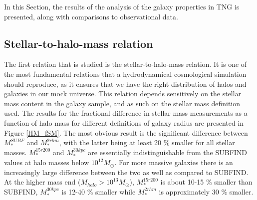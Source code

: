 In this Section, the results of the analysis of the galaxy properties in TNG is presented, along with comparisons to observational data.

\subsection{Stellar-to-halo-mass relation}

The first relation that is studied is the stellar-to-halo-mass relation. It is one of the most fundamental relations that a hydrodynamical cosmological simulation should reproduce, as it ensures that we have the right distribution of halos and galaxies in our mock universe. This relation depends sensitively on the stellar mass content in the galaxy sample, and as such on the stellar mass definition used. The results for the fractional difference in stellar mass measurements as a function of halo mass for different definitions of galaxy radius are presented in Figure \ref{HM_fSM}. The most obvious result is the significant difference between $M_\ast^{SUBF}$ and $M_\ast^{2rhm}$, with the latter being at least 20 \% smaller for all stellar masses. $M_\ast^{15r200}$ and $M_\ast^{30kpc}$ are essentially indistinguishable from the SUBFIND values at halo masses below $10^{12} M_{\odot}$. For more massive galaxies there is an increasingly large difference between the two as well as compared to SUBFIND. At the higher mass end ($M_{halo} > 10^{13} M_{\odot}$), $M_\ast^{15r200}$ is about 10-15 \% smaller than SUBFIND, $M_\ast^{30kpc}$ is 12-40 \% smaller while $M_\ast^{2rhm}$ is approximately 30 \% smaller.


